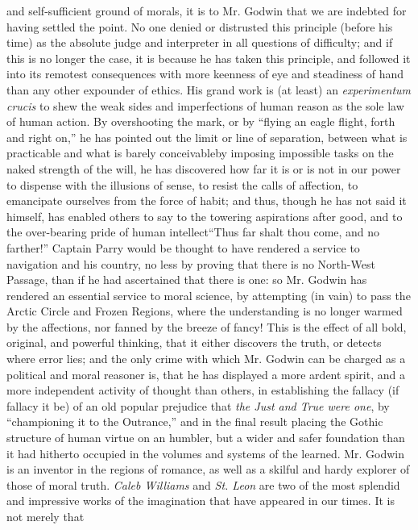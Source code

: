 and self-sufficient ground of morals, it is to Mr. Godwin that we
are indebted for having settled the point. No one denied or
distrusted this principle (before his time) as the absolute judge
and interpreter in all questions of difficulty; and if this is no
longer the case, it is because he has taken this principle, and
followed it into its remotest consequences with more keenness of
eye and steadiness of hand than any other expounder of ethics. His
grand work is (at least) an \emph{experimentum crucis} to shew the
weak sides and imperfections of human reason as the sole law of
human action. By overshooting the mark, or by ``flying an eagle
flight, forth and right on,'' he has pointed out the limit or line
of separation, between what is practicable and what is barely
conceivable\textemdash by imposing impossible tasks on the naked
strength of the will, he has discovered how far it is or is not in
our power to dispense with the illusions of sense, to resist the
calls of affection, to emancipate ourselves from the force of
habit; and thus, though he has not said it himself, has enabled
others to say to the towering aspirations after good, and to the
over-bearing pride of human intellect\textemdash ``Thus far shalt
thou come, and no farther!'' Captain Parry would be thought to
have rendered a service to navigation and his country, no less by
proving that there is no North-West Passage, than if he had
ascertained that there is one: so Mr.  Godwin has rendered an
essential service to moral science, by attempting (in vain) to
pass the Arctic Circle and Frozen Regions, where the understanding
is no longer warmed by the affections, nor fanned by the breeze of
fancy! This is the effect of all bold, original, and powerful
thinking, that it either discovers the truth, or detects where
error lies; and the only crime with which Mr. Godwin can be
charged as a political and moral reasoner is, that he has
displayed a more ardent spirit, and a more independent activity of
thought than others, in establishing the fallacy (if fallacy it
be) of an old popular prejudice that \emph{the Just and True were
one}, by ``championing it to the Outrance,'' and in the final
result placing the Gothic structure of human virtue on an humbler,
but a wider and safer foundation than it had hitherto occupied in
the volumes and systems of the learned. Mr. Godwin is an inventor
in the regions of romance, as well as a skilful and hardy explorer
of those of moral truth. \emph{Caleb Williams} and \emph{St. Leon}
are two of the most splendid and impressive works of the
imagination that have appeared in our times. It is not merely that
